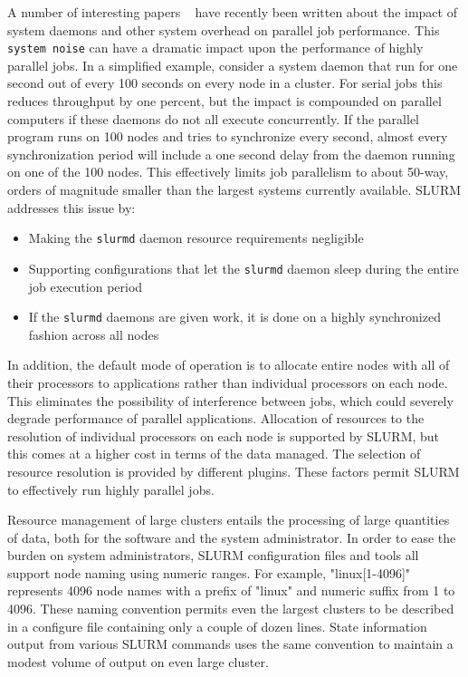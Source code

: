\documentclass[10pt,onecolumn,times]{../common/llncs}
\begin{document}
{A number of interesting papers 
~\cite{Jones2003,Kerbyson2001,Petrini2003,Phillips2003,Tsafrir2005}
have recently been written about
the impact of system daemons and other system overhead on 
parallel job performance. This {\tt system noise} can have a 
dramatic impact upon the performance of highly parallel jobs. 
In a simplified example, consider a system daemon that run for 
one second out of every 100 seconds on every node in a cluster. 
For serial jobs this 
reduces throughput by one percent, but the impact is compounded 
on parallel computers if these daemons do not all execute concurrently. 
If the parallel program runs on 100 nodes and tries to synchronize 
every second, almost every synchronization period will include a
one second delay from the daemon running on one of the 100 nodes. 
This effectively limits job parallelism to about 50-way, orders 
of magnitude smaller than the largest systems currently available.
SLURM addresses this issue by:
\begin{itemize}
\item Making the {\tt slurmd} daemon resource requirements negligible 
\item Supporting configurations that let the {\tt slurmd} daemon sleep 
during the entire job execution period
\item If the {\tt slurmd} daemons are given work, it is done on a 
highly synchronized fashion across all nodes
\end{itemize}
In addition, the default mode of operation is to allocate entire 
nodes with all of their processors to applications rather than 
individual processors on each node. 
This eliminates the possibility of interference between jobs, 
which could severely degrade performance of parallel applications.
Allocation of resources to the resolution of individual processors 
on each node is supported by SLURM, but this comes at a higher cost 
in terms of the data managed.
The selection of resource resolution is provided by different plugins.
These factors permit SLURM to effectively run highly parallel jobs.

Resource management of large clusters entails the processing of 
large quantities of data, both for the software and the 
system administrator.
In order to ease the burden on system administrators, SLURM 
configuration files and tools all support node naming using
numeric ranges.
For example, "linux[1-4096]" represents 4096 node names with 
a prefix of "linux" and numeric suffix from 1 to 4096. 
These naming convention permits even the largest clusters 
to be described in a configure file containing only a 
couple of dozen lines. 
State information output from various SLURM commands uses
the same convention to maintain a modest volume of output
on even large cluster. 

}
\end{document}

